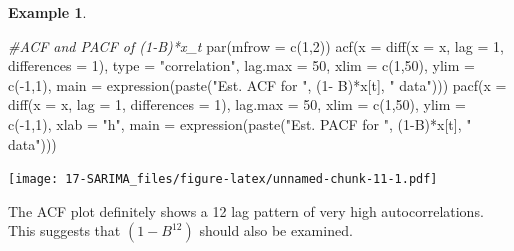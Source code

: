 \documentclass[
]{book}
\newenvironment{Shaded}{\begin{snugshade}}{\end{snugshade}}
\newcommand{\AttributeTok}[1]{\textcolor[rgb]{0.77,0.63,0.00}{#1}}
\newcommand{\CommentTok}[1]{\textcolor[rgb]{0.56,0.35,0.01}{\textit{#1}}}
\newcommand{\DecValTok}[1]{\textcolor[rgb]{0.00,0.00,0.81}{#1}}
\newcommand{\FunctionTok}[1]{\textcolor[rgb]{0.00,0.00,0.00}{#1}}
\newcommand{\NormalTok}[1]{#1}
\newcommand{\OtherTok}[1]{\textcolor[rgb]{0.56,0.35,0.01}{#1}}
\newcommand{\SpecialCharTok}[1]{\textcolor[rgb]{0.00,0.00,0.00}{#1}}
\newcommand{\StringTok}[1]{\textcolor[rgb]{0.31,0.60,0.02}{#1}}
\theoremstyle{definition}
\theoremstyle{definition}
\newtheorem{example}{Example}[chapter]
\theoremstyle{definition}
\theoremstyle{definition}
\theoremstyle{remark}
\begin{document}
\begin{example}
\begin{Shaded}
\begin{Highlighting}[]
\CommentTok{\#ACF and PACF of (1{-}B)*x\_t}
\FunctionTok{par}\NormalTok{(}\AttributeTok{mfrow =} \FunctionTok{c}\NormalTok{(}\DecValTok{1}\NormalTok{,}\DecValTok{2}\NormalTok{))}
\FunctionTok{acf}\NormalTok{(}\AttributeTok{x =} \FunctionTok{diff}\NormalTok{(}\AttributeTok{x =}\NormalTok{ x, }\AttributeTok{lag =} \DecValTok{1}\NormalTok{, }\AttributeTok{differences =} \DecValTok{1}\NormalTok{), }\AttributeTok{type =} 
    \StringTok{"correlation"}\NormalTok{, }\AttributeTok{lag.max =} \DecValTok{50}\NormalTok{, }\AttributeTok{xlim =} \FunctionTok{c}\NormalTok{(}\DecValTok{1}\NormalTok{,}\DecValTok{50}\NormalTok{), }\AttributeTok{ylim =} 
    \FunctionTok{c}\NormalTok{(}\SpecialCharTok{{-}}\DecValTok{1}\NormalTok{,}\DecValTok{1}\NormalTok{), }\AttributeTok{main =} \FunctionTok{expression}\NormalTok{(}\FunctionTok{paste}\NormalTok{(}\StringTok{"Est. ACF for "}\NormalTok{, (}\DecValTok{1}\SpecialCharTok{{-}}
\NormalTok{    B)}\SpecialCharTok{*}\NormalTok{x[t], }\StringTok{" data"}\NormalTok{)))}
\FunctionTok{pacf}\NormalTok{(}\AttributeTok{x =} \FunctionTok{diff}\NormalTok{(}\AttributeTok{x =}\NormalTok{ x, }\AttributeTok{lag =} \DecValTok{1}\NormalTok{, }\AttributeTok{differences =} \DecValTok{1}\NormalTok{), lag.max }
    \OtherTok{=} \DecValTok{50}\NormalTok{, }\AttributeTok{xlim =} \FunctionTok{c}\NormalTok{(}\DecValTok{1}\NormalTok{,}\DecValTok{50}\NormalTok{), }\AttributeTok{ylim =} \FunctionTok{c}\NormalTok{(}\SpecialCharTok{{-}}\DecValTok{1}\NormalTok{,}\DecValTok{1}\NormalTok{), }\AttributeTok{xlab =} \StringTok{"h"}\NormalTok{, }
    \AttributeTok{main =} \FunctionTok{expression}\NormalTok{(}\FunctionTok{paste}\NormalTok{(}\StringTok{"Est. PACF for "}\NormalTok{, (}\DecValTok{1}\SpecialCharTok{{-}}\NormalTok{B)}\SpecialCharTok{*}\NormalTok{x[t], }
    \StringTok{" data"}\NormalTok{)))}
\end{Highlighting}
\end{Shaded}

\texttt{[image: 17-SARIMA\_files/figure-latex/unnamed-chunk-11-1.pdf]}

The ACF plot definitely shows a 12 lag pattern of very high autocorrelations. This suggests that \((1-B^{12})\) should also be examined.


\end{example}
\end{document}
